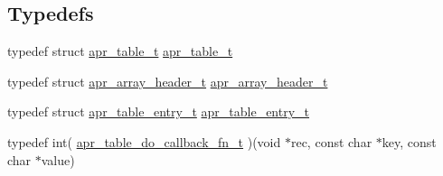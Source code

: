 \subsection*{Typedefs}
\begin{DoxyCompactItemize}
\item 
typedef struct \hyperlink{group__apr__tables_gad7ea82d6608a4a633fc3775694ab71e4}{apr\-\_\-table\-\_\-t} \hyperlink{group__apr__tables_gad7ea82d6608a4a633fc3775694ab71e4}{apr\-\_\-table\-\_\-t}
\item 
typedef struct \hyperlink{structapr__array__header__t}{apr\-\_\-array\-\_\-header\-\_\-t} \hyperlink{group__apr__tables_ga63e76617a1cd3828bbaefcbf93928ec2}{apr\-\_\-array\-\_\-header\-\_\-t}
\item 
typedef struct \hyperlink{structapr__table__entry__t}{apr\-\_\-table\-\_\-entry\-\_\-t} \hyperlink{group__apr__tables_gac7e0151b714e58b75c597dafed75df3f}{apr\-\_\-table\-\_\-entry\-\_\-t}
\item 
typedef int( \hyperlink{group__apr__tables_ga0a59d6b321ade650c7cfa31d7fa93dcc}{apr\-\_\-table\-\_\-do\-\_\-callback\-\_\-fn\-\_\-t} )(void $\ast$rec, const char $\ast$key, const char $\ast$value)
\end{DoxyCompactItemize}
